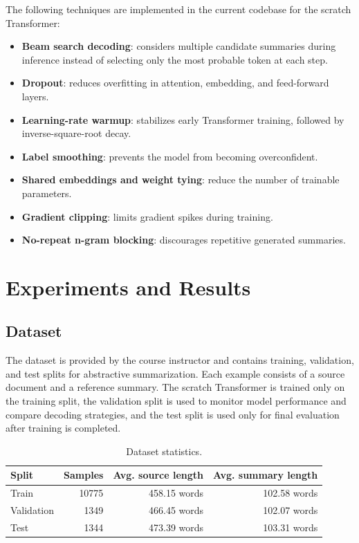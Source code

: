 \documentclass[conference]{IEEEtran}
\begin{document}
The following techniques are implemented in the current codebase for the scratch Transformer:
\begin{itemize}
    \item \textbf{Beam search decoding}: considers multiple candidate summaries during inference instead of selecting only the most probable token at each step.
    \item \textbf{Dropout}: reduces overfitting in attention, embedding, and feed-forward layers.
    \item \textbf{Learning-rate warmup}: stabilizes early Transformer training, followed by inverse-square-root decay.
    \item \textbf{Label smoothing}: prevents the model from becoming overconfident.
    \item \textbf{Shared embeddings and weight tying}: reduce the number of trainable parameters.
    \item \textbf{Gradient clipping}: limits gradient spikes during training.
    \item \textbf{No-repeat n-gram blocking}: discourages repetitive generated summaries.
\end{itemize}

\section{Experiments and Results}

\subsection{Dataset}
The dataset is provided by the course instructor and contains training, validation, and test splits for abstractive summarization. Each example consists of a source document and a reference summary. The scratch Transformer is trained only on the training split, the validation split is used to monitor model performance and compare decoding strategies, and the test split is used only for final evaluation after training is completed.

\begin{table}[htbp]
\centering
\caption{Dataset statistics.}
\label{tab:dataset}
\begin{tabular}{lrrr}
\toprule
Split & Samples & Avg. source length & Avg. summary length \\
\midrule
Train & 10775 & 458.15 words & 102.58 words \\
Validation & 1349 & 466.45 words & 102.07 words \\
Test & 1344 & 473.39 words & 103.31 words \\
\bottomrule
\end{tabular}
\end{table}
\end{document}
